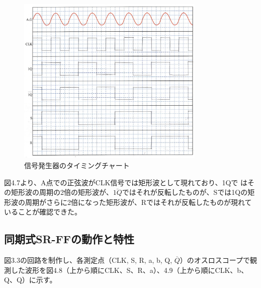 \documentclass{jlreq}
\numberwithin{equation}{section}
\begin{document}
\begin{figure}[H]
  \centering
  \includegraphics[width=0.8\textwidth]{assets/sgchart.png}
  \caption{信号発生器のタイミングチャート}
\end{figure}

図4.7より、A点での正弦波がCLK信号では矩形波として現れており、1Qで
はその矩形波の周期の2倍の矩形波が、\(\overline{1Q}\)ではそれが反転したものが、Sでは1Qの矩形波の周期がさらに2倍になった矩形波が、Rではそれが反転したものが現れていることが確認できた。

\subsection{同期式SR-FFの動作と特性}
図3.3の回路を制作し、各測定点（CLK, S, R, a, b, Q, \(\overline{Q}\)）のオスロスコープで観測した波形を図4.8（上から順にCLK、S、R、a）、4.9（上から順にCLK、b、Q、Q）に示す。
\end{document}
